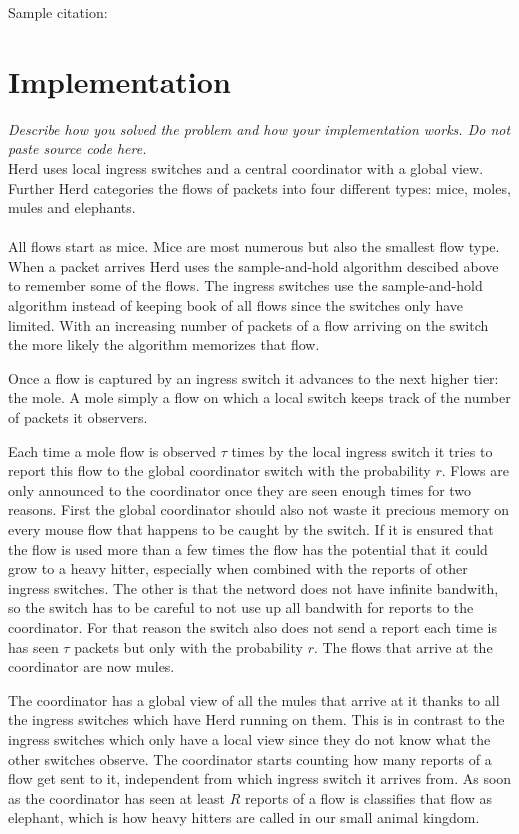 \documentclass[11pt,oneside,a4paper]{article}
\newcommand{\hint}[1]{{\color{blue} \em #1}}
\begin{document}
\lipsum[1-2]
Sample citation: \cite{bosshart2014p4}
\cite{estan2011}

\section{Implementation}
\hint{Describe how you solved the problem and how your implementation works. Do not paste source code here.} \\

Herd uses local ingress switches and a central coordinator with a global view. Further Herd categories the flows of packets into four different types: mice, moles, mules and elephants.\\\\

All flows start as mice. Mice are most numerous but also the smallest flow type. When a packet arrives Herd uses the sample-and-hold algorithm descibed above to remember some of the flows. The ingress switches use the sample-and-hold algorithm instead of keeping book of all flows since the switches only have limited. With an increasing number of packets of a flow arriving on the switch the more likely the algorithm memorizes that flow.

Once a flow is captured by an ingress switch it advances to the next higher tier: the mole. A mole simply a flow on which a local switch keeps track of the number of packets it observers.

Each time a mole flow is observed $\tau$ times by the local ingress switch it tries to report this flow to the global coordinator switch with the probability $r$. Flows are only announced to the coordinator once they are seen enough times for two reasons. First the global coordinator should also not waste it precious memory on every mouse flow that happens to be caught by the switch. If it is ensured that the flow is used more than a few times the flow has the potential that it could grow to a heavy hitter, especially when combined with the reports of other ingress switches. The other is that the netword does not have infinite bandwith, so the switch has to be careful to not use up all bandwith for reports to the coordinator. For that reason the switch also does not send a report each time is has seen $\tau$ packets but only with the probability $r$. The flows that arrive at the coordinator are now mules.

The coordinator has a global view of all the mules that arrive at it thanks to all the ingress switches which have Herd running on them. This is in contrast to the ingress switches which only have a local view since they do not know what the other switches observe. The coordinator starts counting how many reports of a flow get sent to it, independent from which ingress switch it arrives from. As soon as the coordinator has seen at least $R$ reports of a flow is classifies that flow as elephant, which is how heavy hitters are called in our small animal kingdom.\\\\
\end{document}
